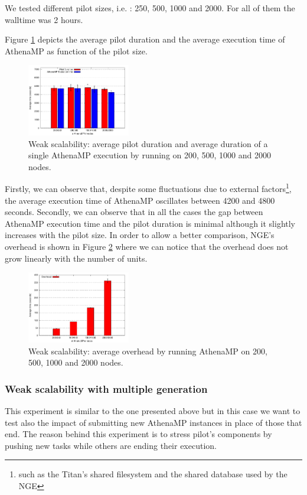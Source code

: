 We tested different pilot sizes, i.e. : 250, 500, 1000 and 2000. For all of them the walltime was 2 hours.

Figure \ref{fig:weakScal1a} depicts the average pilot duration and the average execution time of AthenaMP as function of the pilot size.  

\begin{figure}[!htb]
        \includegraphics[width=0.4\textwidth]{./figures/NGE/weakET1.pdf}
    \caption{Weak scalability: average pilot duration and average duration of a single AthenaMP execution by running on 200, 500, 1000 and 2000 nodes.}
\label{fig:weakScal1a}
\end{figure}

Firstly, we can observe that, despite some fluctuations due to external factors\footnote{such as the Titan's shared filesystem and the shared database used by the NGE}, the average execution time of AthenaMP oscillates between 4200 and 4800 seconds. Secondly, we can observe that in all the cases the gap between AthenaMP execution time and the pilot duration is minimal although it slightly increases with the pilot size.
In order to allow a better comparison, NGE's overhead is shown in Figure \ref{fig:weakScal1b} where we can notice that the overhead does not grow linearly with the number of units.

\begin{figure}[!htb]
        \includegraphics[width=0.4\textwidth]{./figures/NGE/weakOver1.pdf}
    \caption{Weak scalability: average overhead by running AthenaMP on 200, 500, 1000 and 2000 nodes.}
\label{fig:weakScal1b}
\end{figure}


\subsubsection{Weak scalability with multiple generation }
This experiment is similar to the one presented above but in this case we want to test also the impact of submitting new AthenaMP instances in place of those that end. The reason behind this experiment is to stress pilot's components by pushing new tasks while others are ending their execution.

